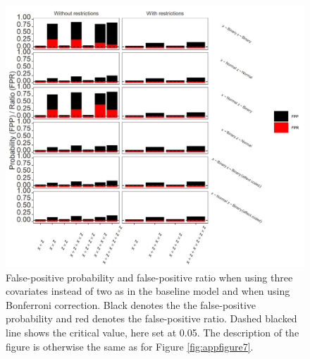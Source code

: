 \begin{figure}[ht!]
\includegraphics[width=1\textwidth]{R/Analysis/Result/Figures/Figure1CSIBon.jpeg}
\centering
\caption{False-positive probability and false-positive ratio when using three covariates instead of two as in the baseline model and when using Bonferroni correction. Black denotes the the false-positive probability and red denotes the false-positive ratio. Dashed blacked line shows the critical value, here set at 0.05. The description of the figure is otherwise the same as for Figure \ref{fig:appfigure7}.
}
\label{fig:appfigure11}
\end{figure}


